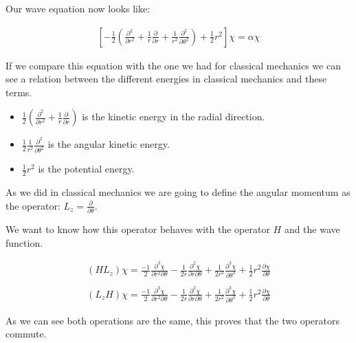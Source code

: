 Our wave equation now looks like:

\begin{equation}
  \begin{array}{c}
    \left[-\frac{1}{2}\left(\frac{\partial^2}{\partial r^2}+\frac{1}{r}\frac{\partial}{\partial r}+\frac{1}{r^2}\frac{\partial^2}{\partial\theta^2}\right)+\frac{1}{2}r^2\right]\chi = \alpha \chi
  \end{array}
\end{equation}

If we compare this equation with the one we had for classical mechanics we can see a relation between the different energies in classical mechanics and these terms.

\begin{itemize}
  \item $\frac{1}{2}\left(\frac{\partial^2}{\partial r^2}+\frac{1}{r}\frac{\partial}{\partial r}\right)$ is the kinetic energy in the radial direction.
  \item $\frac{1}{2}\frac{1}{r^2}\frac{\partial^2}{\partial\theta^2}$ is the angular kinetic energy.
  \item $\frac{1}{2}r^2$ is the potential energy.
\end{itemize}

As we did in classical mechanics we are going to define the angular momentum as the operator: $L_z = \frac{\partial}{\partial\theta}$.

We want to know how this operator behaves with the operator $H$ and the wave function.

\begin{equation}
  \begin{array}{c}
    (H L_z) \chi = \frac{-1}{2} \frac{\partial^3\chi}{\partial r^2 \partial\theta} - \frac{1}{2r} \frac{\partial^2\chi}{\partial r \partial\theta} + \frac{1}{2r^2} \frac{\partial^3\chi}{\partial\theta^3} + \frac{1}{2} r^2 \frac{\partial\chi}{\partial\theta}
    \\

    \\
    (L_z H) \chi = \frac{-1}{2} \frac{\partial^3\chi}{\partial r^2 \partial\theta} - \frac{1}{2r} \frac{\partial^2\chi}{\partial r \partial\theta} + \frac{1}{2r^2} \frac{\partial^3\chi}{\partial\theta^3} + \frac{1}{2} r^2 \frac{\partial\chi}{\partial\theta}
  \end{array}
\end{equation}

As we can see both operations are the same, this proves that the two operators commute.

